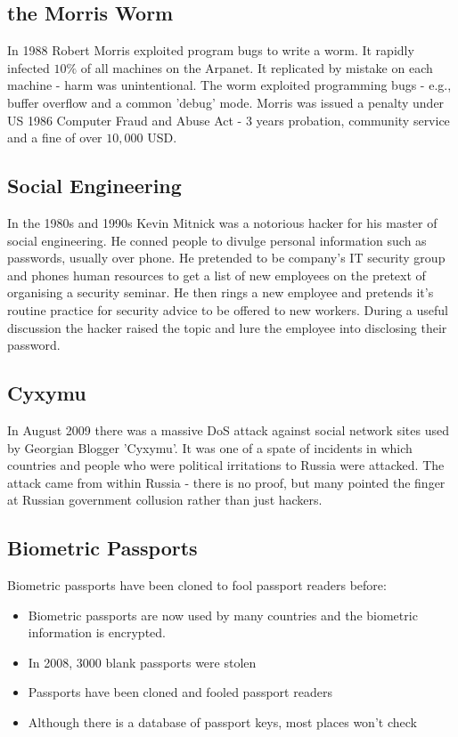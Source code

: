 \documentclass[a4paper]{article}
\theoremstyle{plain}
\theoremstyle{definition}
\theoremstyle{remark}
\begin{document}
\subsection{the Morris Worm}
In 1988 Robert Morris exploited program bugs to write a worm. It rapidly infected $10\%$ of all machines on the Arpanet. It replicated by mistake on each machine - harm was unintentional. The worm exploited programming bugs - e.g., buffer overflow and a common 'debug' mode. Morris was issued a penalty under US 1986 Computer Fraud and Abuse Act - 3 years probation, community service and a fine of over $10,000$ USD.
\subsection{Social Engineering}
In the 1980s and 1990s Kevin Mitnick was a notorious hacker for his master of social engineering. He conned people to divulge personal information such as passwords, usually over phone. He pretended to be company's IT security group and phones human resources to get a list of new employees on the pretext of organising a security seminar. He then rings a new employee and pretends it's routine practice for security advice to be offered to new workers. During a useful discussion the hacker raised the topic and lure the employee into disclosing their password. 
\subsection{Cyxymu}
In August 2009 there was a massive DoS attack against social network sites used by Georgian Blogger 'Cyxymu'. It was one of a spate of incidents in which countries and people who were political irritations to Russia were attacked. The attack came from within Russia - there is no proof, but many pointed the finger at Russian government collusion rather than just hackers.
\subsection{Biometric Passports}
Biometric passports have been cloned to fool passport readers before:
\begin{itemize}
	\item Biometric passports are now used by many countries and the biometric information is encrypted. 
	\item In 2008, 3000 blank passports were stolen
	\item Passports have been cloned and fooled passport readers
	\item Although there is a database of passport keys, most places won't check
\end{itemize}
\end{document}
